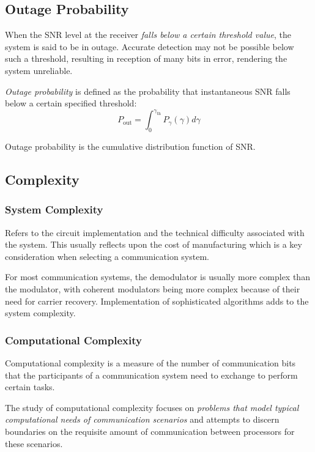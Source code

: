 \subsection{Outage Probability}
When the \gls{SNR} level at the receiver \emph{falls below a certain threshold value}, the system is said to be in outage. Accurate detection may not be possible below such a threshold, resulting in reception of many bits in error, rendering the system unreliable\cite{MIMO}.

\emph{Outage probability} is defined as the probability that instantaneous SNR falls below a certain specified threshold:
\[
	P_{\text{out}} = \int_0^{\gamma_{\text{th}}} P_\gamma (\gamma) d\gamma
\]
\begin{mathDef}
\end{mathDef}
Outage probability is the cumulative distribution function of SNR.

\subsection{Complexity}
\subsubsection{System Complexity}
Refers to the circuit implementation and the technical difficulty associated with the system. This usually reflects upon the cost of manufacturing which is a key consideration when selecting a communication system.

For most communication systems, the demodulator is usually more complex than the modulator, with coherent modulators being more complex because of their need for carrier recovery. Implementation of sophisticated algorithms adds to the system complexity.
\subsubsection{Computational Complexity}
Computational complexity is a measure of the number of communication bits that the participants of a communication system need to exchange to perform certain tasks.

The study of computational complexity focuses on \emph{problems that model typical computational needs of communication scenarios} and attempts to discern boundaries on the requisite amount of communication between processors for these scenarios.

